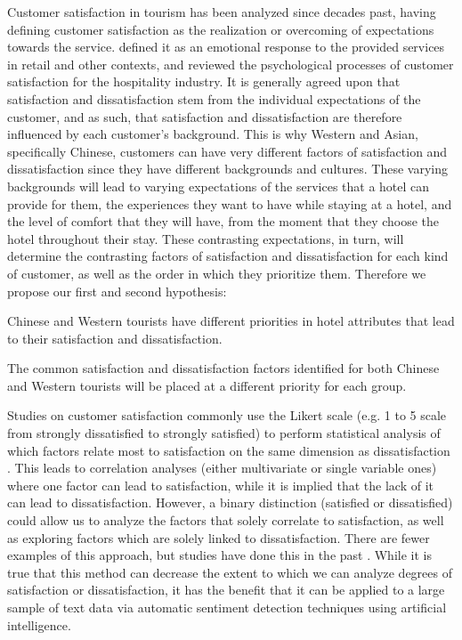 Customer satisfaction in tourism has been analyzed since decades past, \cite{hunt1975} having defining customer satisfaction as the realization or overcoming of expectations towards the service. \cite{oliver1981} defined it as an emotional response to the provided services in retail and other contexts, and \cite{oh1996} reviewed the psychological processes of customer satisfaction for the hospitality industry. It is generally agreed upon that satisfaction and dissatisfaction stem from the individual expectations of the customer, and as such, \cite{engel1990} \DIFdelbegin {}\DIFdelend \DIFaddbegin {}\DIFaddend that satisfaction and dissatisfaction are therefore influenced by each customer's background. This is why Western and Asian, specifically Chinese, customers can have very different factors of satisfaction and dissatisfaction since they have different backgrounds and cultures. These varying backgrounds will lead to varying expectations of the services that a hotel can provide for them, the experiences they want to have while staying at a hotel, and the level of comfort that they will have, from the moment that they choose the hotel throughout their stay. These contrasting expectations, in turn, will determine the contrasting factors of satisfaction and dissatisfaction for each kind of customer, as well as the order in which they prioritize them.
Therefore we propose our first and second hypothesis:

\begin{hyp}
\label{hyp:1}
Chinese and Western tourists have different priorities in hotel attributes that lead to their satisfaction and dissatisfaction.
\end{hyp}

\begin{hyp}
\label{hyp:2}
The common satisfaction and dissatisfaction factors identified for both Chinese and Western tourists will be placed at a different priority for each group.
\end{hyp}

Studies on customer satisfaction \cite[e.g.][]{truong2009, romao2014, wu2009} commonly use the Likert scale \cite[][]{likert1932technique} (e.g. 1 to 5 scale from strongly dissatisfied to strongly satisfied) to perform statistical analysis of which factors relate most to satisfaction on the same dimension as dissatisfaction \cite[e.g.][]{chan201518, choi2000}. This leads to correlation analyses (either multivariate or single variable ones) where one factor can lead to satisfaction, while it is implied that the lack of it can lead to dissatisfaction. However, a binary distinction (satisfied or dissatisfied) could allow us to analyze the factors that solely correlate to satisfaction, as well as exploring factors which are solely linked to dissatisfaction. There are fewer examples of this approach, but studies have \DIFdelbegin {}\DIFdelend done this in the past \cite[e.g.][]{zhou2014}. While it is true that this method can decrease the extent to which we can analyze degrees of satisfaction or dissatisfaction, it has the benefit that it can be applied to a large sample of text data via automatic sentiment detection techniques using artificial intelligence. 

